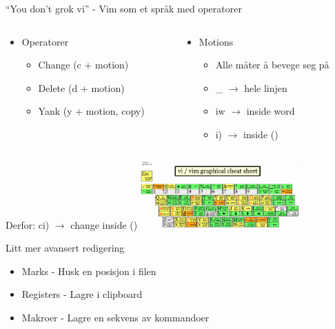 \documentclass{beamer}
\begin{document}
\begin{frame}{``You don't grok vi'' - Vim som et språk med operatorer}
	\begin{center}
		\begin{columns}
			\begin{column}{0.5\textwidth}
				\begin{itemize}
					\item Operatorer
					      \begin{itemize}
						      \item Change (c + motion)
						      \item Delete (d + motion)
						      \item Yank (y + motion, copy)
					      \end{itemize}
				\end{itemize}
			\end{column}
			\begin{column}{0.5\textwidth}
				\begin{itemize}
					\item Motions
					      \begin{itemize}
						      \item Alle måter å bevege seg på
						      \item \_ $\rightarrow$ hele linjen
						      \item iw $\rightarrow$ inside word
						      \item i) $\rightarrow$ inside ()
					      \end{itemize}
				\end{itemize}
			\end{column}
		\end{columns}
		\vspace{20px}
		Derfor: ci) $\rightarrow$ change inside ()
		{\includegraphics[width=230px]{images/vim-cheat-sheet.png}}
	\end{center}
\end{frame}

\begin{frame}{Litt mer avansert redigering}
    \begin{itemize}
        \item Marks - Husk en posisjon i filen
        \item Registers - Lagre i clipboard
        \item Makroer - Lagre en sekvens av kommandoer
    \end{itemize}
\end{frame}
\end{document}
